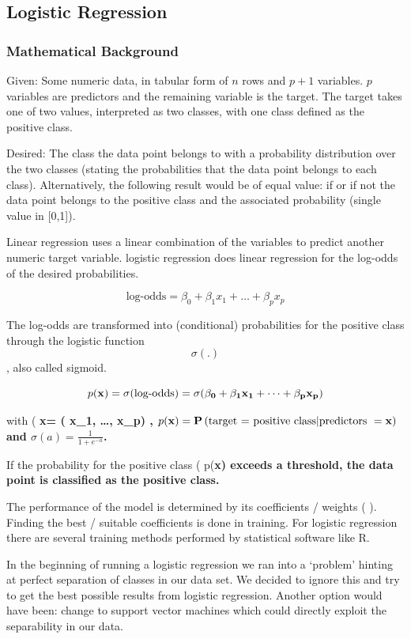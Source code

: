 \documentclass[]{article}
\begin{document}
\subsection{Logistic Regression}\label{logistic-regression}

\subsubsection{Mathematical Background}\label{mathematical-background}

Given: Some numeric data, in tabular form of \(n\) rows and \(p+1\)
variables. \(p\) variables are predictors and the remaining variable is
the target. The target takes one of two values, interpreted as two
classes, with one class defined as the positive class.

Desired: The class the data point belongs to with a probability
distribution over the two classes (stating the probabilities that the
data point belongs to each class). Alternatively, the following result
would be of equal value: if or if not the data point belongs to the
positive class and the associated probability (single value in
{[}0,1{]}).

Linear regression uses a linear combination of the variables to predict
another numeric target variable. logistic regression does linear
regression for the log-odds of the desired probabilities.

\[
\text{log-odds} = \beta_0 + \beta_1 x_1 + \dots + \beta_p x_p     
\]

The log-odds are transformed into (conditional) probabilities for the
positive class through the logistic function \[\sigma(.)\], also called
sigmoid.

\[
p(\bf{x}) = \sigma(\text{log-odds}) = \sigma(\beta_0 + \beta_1 x_1 + \dots + \beta_p x_p ) 
\]

with (
\bf{x}= ( x_1, \dots, x_p) \) , \( p(\bf{x}) = \mathbf{P}\left(\text{target = positive class} | \text{predictors } = \bf{x} \right) \) and  \( \sigma(a) = \frac{1}{1+e^{-a}} \).

If the probability for the positive class (
p(\bf{x}) \)  exceeds a threshold, the data point is classified as the positive class.

The performance of the model is determined by its coefficients / weights
( \beta ). Finding the best / suitable coefficients is done in training.
For logistic regression there are several training methods performed by
statistical software like R.

In the beginning of running a logistic regression we ran into a
`problem' hinting at perfect separation of classes in our data set. We
decided to ignore this and try to get the best possible results from
logistic regression. Another option would have been: change to support
vector machines which could directly exploit the separability in our
data.
\end{document}
